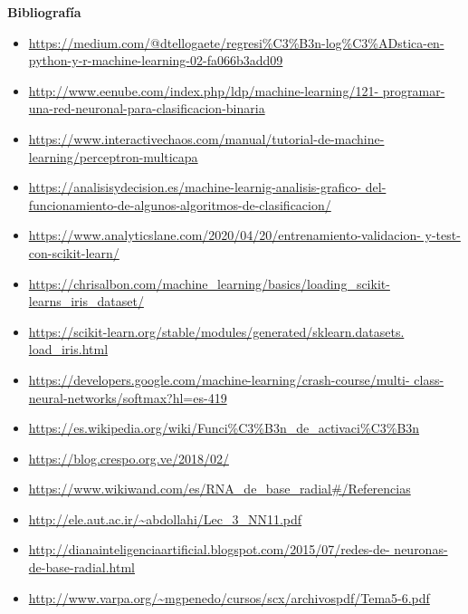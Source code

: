 \documentclass[letterpaper,11pt]{article}
\begin{document}
\textbf{Bibliografía}
\begin{itemize}
    \item \url{https://medium.com/@dtellogaete/regresi%
               python-y-r-machine-learning-02-fa066b3add09}
    \item \url{http://www.eenube.com/index.php/ldp/machine-learning/121-
               programar-una-red-neuronal-para-clasificacion-binaria}
    \item \url{https://www.interactivechaos.com/manual/tutorial-de-machine-
               learning/perceptron-multicapa}
    \item \url{https://analisisydecision.es/machine-learnig-analisis-grafico-
               del-funcionamiento-de-algunos-algoritmos-de-clasificacion/}
    \item \url{https://www.analyticslane.com/2020/04/20/entrenamiento-validacion-
               y-test-con-scikit-learn/}
    \item \url{https://chrisalbon.com/machine_learning/basics/loading_scikit-
               learns_iris_dataset/}
    \item \url{https://scikit-learn.org/stable/modules/generated/sklearn.datasets.
               load_iris.html}
    \item \url{https://developers.google.com/machine-learning/crash-course/multi-
               class-neural-networks/softmax?hl=es-419}
    \item \url{https://es.wikipedia.org/wiki/Funci%C3%B3n_de_activaci%C3%B3n}
    \item \url{https://blog.crespo.org.ve/2018/02/}
    \item \url{https://www.wikiwand.com/es/RNA_de_base_radial#/Referencias}
    \item \url{http://ele.aut.ac.ir/~abdollahi/Lec_3_NN11.pdf}
    \item \url{http://dianainteligenciaartificial.blogspot.com/2015/07/redes-de-
               neuronas-de-base-radial.html}
    \item \url{http://www.varpa.org/~mgpenedo/cursos/scx/archivospdf/Tema5-6.pdf}
\end{itemize}
\end{document}
